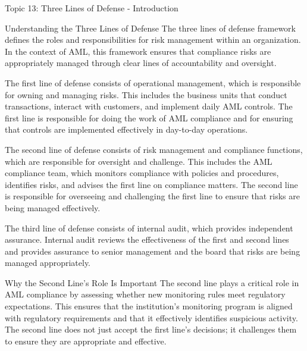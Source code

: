 \documentclass[8pt]{beamer}  %
\begin{document}
	\begin{frame}{Topic 13: Three Lines of Defense - Introduction}
		\begin{block}{\large Understanding the Three Lines of Defense}
			The three lines of defense framework defines the roles and responsibilities for risk management within an organization. In the context of AML, this framework ensures that compliance risks are appropriately managed through clear lines of accountability and oversight.
			
			The first line of defense consists of operational management, which is responsible for owning and managing risks. This includes the business units that conduct transactions, interact with customers, and implement daily AML controls. The first line is responsible for doing the work of AML compliance and for ensuring that controls are implemented effectively in day-to-day operations.
			
			The second line of defense consists of risk management and compliance functions, which are responsible for oversight and challenge. This includes the AML compliance team, which monitors compliance with policies and procedures, identifies risks, and advises the first line on compliance matters. The second line is responsible for overseeing and challenging the first line to ensure that risks are being managed effectively.
			
			The third line of defense consists of internal audit, which provides independent assurance. Internal audit reviews the effectiveness of the first and second lines and provides assurance to senior management and the board that risks are being managed appropriately.
		\end{block}
		
		\vspace{0.2cm}
		\begin{block}{\large Why the Second Line's Role Is Important}
			The second line plays a critical role in AML compliance by assessing whether new monitoring rules meet regulatory expectations. This ensures that the institution's monitoring program is aligned with regulatory requirements and that it effectively identifies suspicious activity. The second line does not just accept the first line's decisions; it challenges them to ensure they are appropriate and effective.
		\end{block}
	\end{frame}
	
\end{document}
